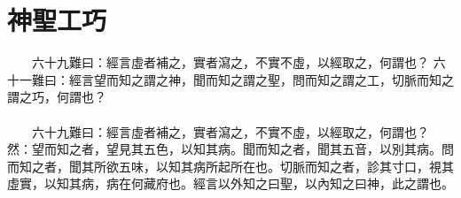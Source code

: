 \section{神聖工巧}

　　六十九難曰：經言虛者補之，實者瀉之，不實不虛，以經取之，何謂也？
六十一難曰：經言望而知之謂之神，聞而知之謂之聖，問而知之謂之工，切脈而知之謂之巧，何謂也？
\\\\
　　六十九難曰：經言虛者補之，實者瀉之，不實不虛，以經取之，何謂也？
然：望而知之者，望見其五色，以知其病。聞而知之者，聞其五音，以別其病。問而知之者，聞其所欲五味，以知其病所起所在也。切脈而知之者，診其寸口，視其虛實，以知其病，病在何藏府也。經言以外知之曰聖，以內知之曰神，此之謂也。